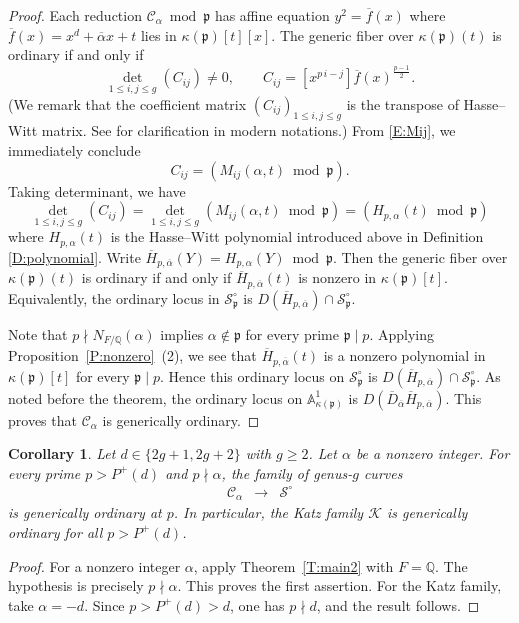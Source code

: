 \documentclass{amsart}
\theoremstyle{plain}
\newtheorem{corollary}[theorem]{Corollary}
\theoremstyle{remark}
\theoremstyle{remark}
\newcommand{\fp}{\mathfrak{p}}
\newcommand{\cS}{\mathcal{S}}
\newcommand{\cK}{\mathcal{K}}
\newcommand{\cC}{\mathcal{C}}
\renewcommand{\bar}{\overline}
\newcommand{\0}{\mathbf{0}}
\newcommand{\1}{\mathbf{1}}
\newcommand{\A}{\mathbb{A}}
\newcommand{\Q}{\mathbb{Q}}
\begin{document}
\begin{proof}
Each reduction $\cC_\alpha\bmod \fp$ has affine equation $y^2=\bar{f}(x)$
where 
$\bar{f}(x)=x^d+\bar{\alpha}x+t
$ lies in $\kappa(\fp)[t][x]$.
The generic fiber over $\kappa(\fp)(t)$ is ordinary if 
and only if 
$$\det_{1\le i,j\le g} (C_{ij})\ne 0,\qquad  
C_{ij}=[x^{p\,i-j}]\bar{f}(x)^{\frac{p-1}{2}}.
$$
(We remark that the coefficient matrix $(C_{ij})_{1\le i,j\le g}$ 
is the transpose of Hasse--Witt matrix.
See \cite{AH19} for clarification in modern notations.)
From  \eqref{E:Mij}, we immediately conclude
$$
C_{ij}= (M_{ij}(\alpha,t) \bmod \fp).
$$
Taking determinant, we have
$$\det_{1\le i,j\le g} (C_{ij})= \det_{1\le i,j\le g} (M_{ij}(\alpha,t)\bmod \fp)
=(H_{p,\alpha}(t)\bmod \fp)$$
where $H_{p,\alpha}(t)$ is the Hasse--Witt polynomial 
introduced above in Definition \ref{D:polynomial}.
Write $\bar{H}_{p,\bar\alpha}(Y)=H_{p,\alpha}(Y)\bmod \fp$.
Then the generic fiber over $\kappa(\fp)(t)$ 
is ordinary if and only if 
$\bar{H}_{p,\bar\alpha}(t)$ is nonzero in $\kappa(\fp)[t]$.
Equivalently, the ordinary locus in $\cS_\fp^\circ$ is
$D(\bar{H}_{p,\bar\alpha})\cap \cS^\circ_{\fp}$.

Note that $p\nmid N_{F/\Q}(\alpha)$ implies $\alpha\not\in\fp$ for every 
prime $\fp\mid p$. Applying 
Proposition~\ref{P:nonzero}~(2), 
we see that $\bar{H}_{p,\bar\alpha}(t)$ 
is a nonzero polynomial in $\kappa(\fp)[t]$ for every $\fp\mid p$. 
Hence this ordinary locus on $\cS_\fp^\circ$ is  $D(\bar{H}_{p,\bar\alpha})\cap \cS_\fp^\circ$.
As noted before the theorem, 
the ordinary locus on $\A^1_{\kappa(\fp)}$ 
is $D(\bar{D}_{\bar\alpha} \bar{H}_{p,\bar\alpha})$.
This proves that $\cC_\alpha$ is generically ordinary.
\end{proof}



\begin{corollary}\label{C:integer}
Let $d\in\{2g+1,2g+2\}$ with $g\ge 2$.
Let $\alpha$ be a nonzero integer.
For every prime $p>P^+(d)$ and $p\nmid \alpha$,
the family of genus-$g$ curves 
\begin{eqnarray*}
\cC_\alpha &\longrightarrow & \cS^\circ
\end{eqnarray*}
is generically ordinary at $p$. In particular, the Katz family 
$\cK$ is generically ordinary for all $p>P^+(d)$.
\end{corollary}

\begin{proof}
For a nonzero integer $\alpha$, apply Theorem~\ref{T:main2} with
$F=\Q$. The hypothesis is precisely $p\nmid\alpha$. This proves the first
assertion.
For the Katz family, take $\alpha=-d$. Since $p>P^+(d)>d$, one has 
$p\nmid d$, and the result follows.
\end{proof}
\end{document}
